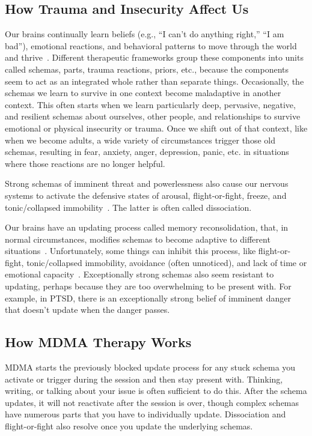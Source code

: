 \documentclass[11pt,oneside]{book}
\newcommand{\mdcite}[1]{}
\begin{document}
\subsection*{How Trauma and Insecurity Affect Us}
Our brains continually learn beliefs (e.g., \enquote{I can't do anything right,} \enquote{I am bad}), emotional reactions, and behavioral patterns to move through the world and thrive~\mdcite{eckerUnlocking}. Different therapeutic frameworks group these components into units called schemas, parts, trauma reactions, priors, etc., because the components seem to act as an integrated whole rather than separate things. Occasionally, the schemas we learn to survive in one context become maladaptive in another context. This often starts when we learn particularly deep, pervasive, negative, and resilient schemas about ourselves, other people, and relationships to survive emotional or physical insecurity or trauma. Once we shift out of that context, like when we become adults, a wide variety of circumstances trigger those old schemas, resulting in fear, anxiety, anger, depression, panic, etc. in situations where those reactions are no longer helpful.

Strong schemas of imminent threat and powerlessness also cause our nervous systems to activate the defensive states of arousal, flight-or-fight, freeze, and tonic/collapsed immobility~\mdcite{kozlowskaDefenseCascade}. The latter is often called dissociation.

Our brains have an updating process called memory reconsolidation, that, in normal circumstances, modifies schemas to become adaptive to different situations~\mdcite{eckerUnlocking}. Unfortunately, some things can inhibit this process, like flight-or-fight, tonic/collapsed immobility, avoidance (often unnoticed), and lack of time or emotional capacity~\mdcite{berghBSTS,kozlowskaDefenseCascade}. Exceptionally strong schemas also seem resistant to updating, perhaps because they are too overwhelming to be present with. For example, in PTSD, there is an exceptionally strong belief of imminent danger that doesn't update when the danger passes.

\subsection*{How MDMA Therapy Works}
MDMA starts the previously blocked update process for any stuck schema you activate or trigger during the session and then stay present with. Thinking, writing, or talking about your issue is often sufficient to do this. After the schema updates, it will not reactivate after the session is over, though complex schemas have numerous parts that you have to individually update. Dissociation and flight-or-fight also resolve once you update the underlying schemas.
\end{document}
